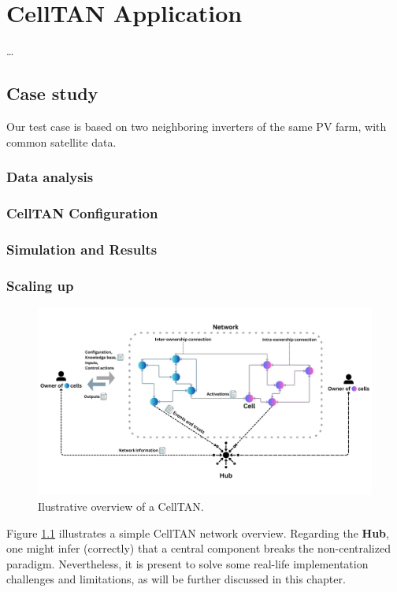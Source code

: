 \chapter{CellTAN Application} \label{chap:chap5}

\dots

\section{Case study}

Our test case is based on two neighboring inverters of the same PV farm, with common satellite data.

\subsection{Data analysis}


\subsection{CellTAN Configuration}


\subsection{Simulation and Results}


\subsection{Scaling up}

\begin{figure}[h!]
    \centering
    \includegraphics[width=\linewidth]{figures/chapter4/cell/celltan.pdf}
    \caption{Ilustrative overview of a CellTAN.}
    \label{fig:celltan}
\end{figure}

Figure \ref{fig:celltan} illustrates a simple CellTAN network overview. Regarding the \textbf{Hub}, one might infer (correctly) that a central component breaks the non-centralized paradigm. Nevertheless, it is present to solve some real-life implementation challenges and limitations, as will be further discussed in this chapter.
